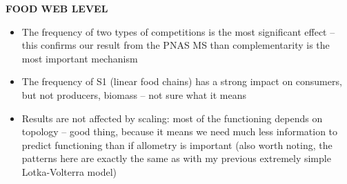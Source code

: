 \documentclass[12pt]{article}
\begin{document}
\textbf{FOOD WEB LEVEL}
\begin{itemize}
	\item The frequency of two types of competitions is the most significant effect -- this confirms our result from the PNAS MS than complementarity is the most important mechanism
	\item The frequency of S1 (linear food chains) has a strong impact on consumers, but not producers, biomass -- not sure what it means
	\item Results are not affected by scaling: most of the functioning depends on topology -- good thing, because it means we need much less information to predict functioning than if allometry is important (also worth noting, the patterns here are exactly the same as with my previous extremely simple Lotka-Volterra model)
\end{itemize}

\printbibliography
\end{document}
